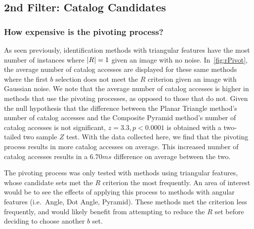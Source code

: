 \subsection{2nd Filter: Catalog Candidates}\label{subsec:2ndFilter:CatalogCandidates}
\begin{figure}
\end{figure}

\subsubsection{How expensive is the pivoting process?}
As seen previously, identification methods with triangular features have the most number of instances where
$\left| R \right| = 1$ given an image with no noise.
In~\autoref{fig:rPivot}, the average number of catalog accesses are displayed for these same methods where the first
$b$ selection does not meet the $R$ criterion given an image with Gaussian noise.
We note that the average number of catalog accesses is higher in methods that use the pivoting processes,
as opposed to those that do not.
Given the null hypothesis that the difference between the Planar Triangle method's number of catalog accesses and
the Composite Pyramid method's number of catalog accesses is not significant, $z = 3.3, p < 0.0001$ is
obtained with a two-tailed two sample $Z$ test.
With the data collected here, we find that the pivoting process results in more catalog accesses on average.
This increased number of catalog accesses results in a $6.70\si{ms}$ difference on average between the two.

The pivoting process was only tested with methods using triangular features, whose candidate sets met the $R$ criterion
the most frequently.
An area of interest would be to see the effects of applying this process to methods with angular features (i.e.\ Angle,
Dot Angle, Pyramid).
These methods met the criterion less frequently, and would likely benefit from attempting to reduce the $R$ set before
deciding to choose another $b$ set.

